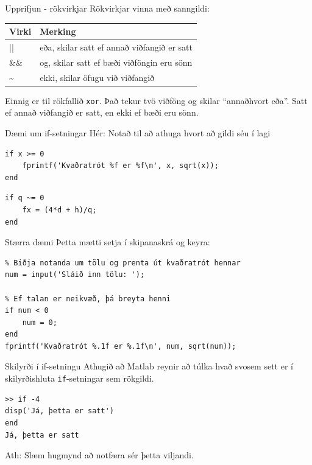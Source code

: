 \documentclass{beamer}
\begin{document}
\begin{frame}{Upprifjun - rökvirkjar}
Rökvirkjar vinna með sanngildi:
\begin{center}
\begin{tabular}{ll}
\toprule
Virki&Merking\\
\midrule
||& eða, skilar satt ef annað viðfangið er satt\\
\&\& & og, skilar satt ef bæði viðföngin eru sönn\\
\~{} &ekki, skilar öfugu við viðfangið\\
\bottomrule
\end{tabular}
\end{center}
Einnig er til rökfallið \texttt{xor}. Það tekur tvö viðföng og skilar ``annaðhvort eða''. Satt ef annað viðfangið er satt, en ekki ef bæði eru sönn.
\end{frame}

\begin{frame}[fragile]{Dæmi um if-setningar}
Hér: Notað til að athuga hvort að gildi séu í lagi
\begin{verbatim}
if x >= 0
    fprintf('Kvaðratrót %f er %f\n', x, sqrt(x));
end
\end{verbatim}

\begin{verbatim}
if q ~= 0
    fx = (4*d + h)/q;
end
\end{verbatim}

\end{frame}

\begin{frame}[fragile]{Stærra dæmi}
Þetta mætti setja í skipanaskrá og keyra:
\begin{verbatim}
% Biðja notanda um tölu og prenta út kvaðratrót hennar
num = input('Sláið inn tölu: ');

% Ef talan er neikvæð, þá breyta henni
if num < 0
    num = 0;
end
fprintf('Kvaðratrót %.1f er %.1f\n', num, sqrt(num));
\end{verbatim}
\end{frame}

\begin{frame}[fragile]{Skilyrði í if-setningu}
Athugið að Matlab reynir að túlka hvað svosem sett er í skilyrðishluta \texttt{if}-setningar sem rökgildi.

\begin{verbatim}
>> if -4
disp('Já, þetta er satt')
end
Já, þetta er satt
\end{verbatim}
Ath: Slæm hugmynd að notfæra sér þetta viljandi.
\end{frame}
\end{document}
